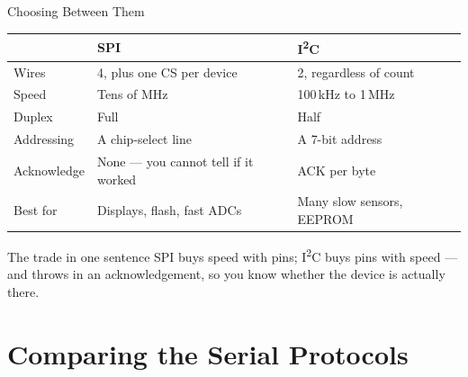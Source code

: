 \documentclass[9pt,aspectratio=169,xcolor=table]{beamer}
\begin{document}
\begin{frame}{Choosing Between Them}
    \begin{center}
    {\small
    \striped
    \begin{tabular}{@{}l l l@{}}
        \toprule
         & \textbf{SPI} & \textbf{I\textsuperscript{2}C} \\
        \midrule
        Wires & 4, plus one CS \alert{per device} & \alert{2}, regardless of count \\
        Speed & \alert{Tens of MHz} & 100\,kHz to 1\,MHz \\
        Duplex & Full & Half \\
        Addressing & A chip-select line & A \alert{7-bit address} \\
        Acknowledge & None --- you cannot tell if it worked & \alert{ACK} per byte \\
        Best for & Displays, flash, fast ADCs & Many slow sensors, EEPROM \\
        \bottomrule
    \end{tabular}}
    \end{center}

    \vspace{3mm}
    \begin{block}{The trade in one sentence}
        \alert{SPI buys speed with pins}; \alert{I\textsuperscript{2}C buys pins
        with speed} --- and throws in an acknowledgement, so you know whether the
        device is actually there.
    \end{block}
\end{frame}


\section{Comparing the Serial Protocols}
\end{document}
